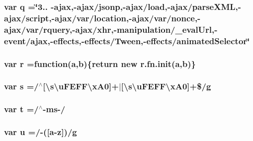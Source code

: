 \subsubsection[{\texorpdfstring{q}{q}}]{\setlength{\rightskip}{0pt plus 5cm}var q =\char`\"{}3.. -\/ajax,-\/ajax/jsonp,-\/ajax/load,-\/ajax/parse\+X\+ML,-\/ajax/script,-\/ajax/var/location,-\/ajax/var/nonce,-\/ajax/var/rquery,-\/ajax/xhr,-\/manipulation/\+\_\+eval\+Url,-\/event/ajax,-\/effects,-\/effects/Tween,-\/effects/animated\+Selector\char`\"{}}\hypertarget{jquery-3_8js_aee3046c01d22ccd1efcb944608aec125}{}\label{jquery-3_8js_aee3046c01d22ccd1efcb944608aec125}
\subsubsection[{\texorpdfstring{r}{r}}]{\setlength{\rightskip}{0pt plus 5cm}var r =function({\bf a},{\bf b})\{return new r.\+fn.\+init({\bf a},{\bf b})\}}\hypertarget{jquery-3_8js_a07c0e0a63b5b484807c0331c78558c9e}{}\label{jquery-3_8js_a07c0e0a63b5b484807c0331c78558c9e}
\subsubsection[{\texorpdfstring{s}{s}}]{\setlength{\rightskip}{0pt plus 5cm}var s =/$^\wedge$\mbox{[}\textbackslash{}s\textbackslash{}u\+F\+E\+F\+F\textbackslash{}x\+A0\mbox{]}+$\vert$\mbox{[}\textbackslash{}s\textbackslash{}u\+F\+E\+F\+F\textbackslash{}x\+A0\mbox{]}+\$/{\bf g}}\hypertarget{jquery-3_8js_ad9a7d92cb87932d25187fdec3ba1b621}{}\label{jquery-3_8js_ad9a7d92cb87932d25187fdec3ba1b621}
\subsubsection[{\texorpdfstring{t}{t}}]{\setlength{\rightskip}{0pt plus 5cm}var t =/$^\wedge$-\/ms-\//}\hypertarget{jquery-3_8js_a5459dd59c2ac7c323d9ca8bca22ff249}{}\label{jquery-3_8js_a5459dd59c2ac7c323d9ca8bca22ff249}
\subsubsection[{\texorpdfstring{u}{u}}]{\setlength{\rightskip}{0pt plus 5cm}var u =/-\/(\mbox{[}{\bf a}-\/z\mbox{]})/{\bf g}}\hypertarget{jquery-3_8js_accb4ce8dd4113ac0f510653e31809106}{}\label{jquery-3_8js_accb4ce8dd4113ac0f510653e31809106}

